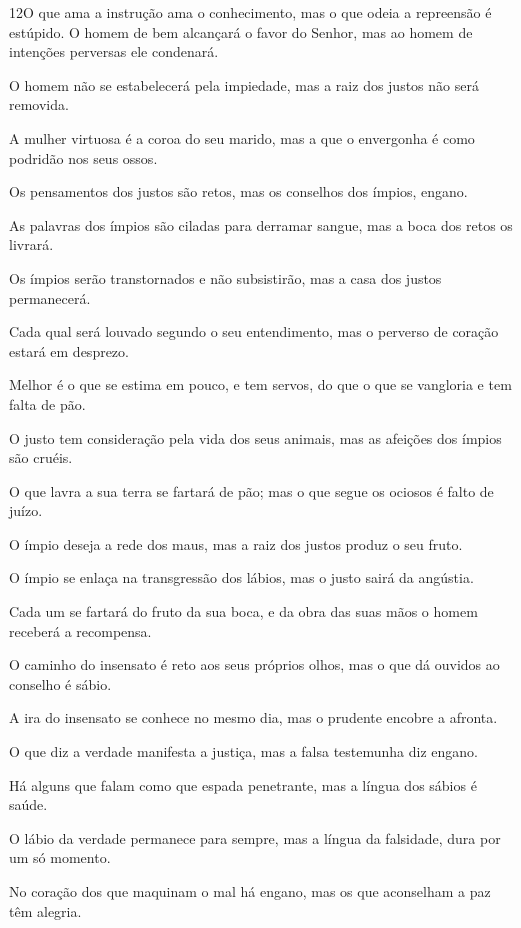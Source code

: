 \medskip

\lettrine{12}{}O que ama a instrução ama o conhecimento, mas o
que odeia a repreensão é estúpido.  O homem de bem
alcançará o favor do Senhor, mas ao homem de intenções perversas ele
condenará.

O homem não se estabelecerá pela impiedade, mas a raiz dos justos
não será removida.

A mulher virtuosa é a coroa do seu marido, mas a que o envergonha
é como podridão nos seus ossos.

Os pensamentos dos justos são retos, mas os conselhos dos ímpios,
engano.

As palavras dos ímpios são ciladas para derramar sangue, mas a
boca dos retos os livrará.

Os ímpios serão transtornados e não subsistirão, mas a casa dos
justos permanecerá.

Cada qual será louvado segundo o seu entendimento, mas o perverso
de coração estará em desprezo.

Melhor é o que se estima em pouco, e tem servos, do que o que se
vangloria e tem falta de pão.

O justo tem consideração pela vida dos seus animais, mas as
afeições dos ímpios são cruéis.

O que lavra a sua terra se fartará de pão; mas o que segue os
ociosos é falto de juízo.

O ímpio deseja a rede dos maus, mas a raiz dos justos produz o
seu fruto.

O ímpio se enlaça na transgressão dos lábios, mas o justo sairá
da angústia.

Cada um se fartará do fruto da sua boca, e da obra das suas mãos
o homem receberá a recompensa.

O caminho do insensato é reto aos seus próprios olhos, mas o que
dá ouvidos ao conselho é sábio.

A ira do insensato se conhece no mesmo dia, mas o prudente
encobre a afronta.

O que diz a verdade manifesta a justiça, mas a falsa testemunha
diz engano.

Há alguns que falam como que espada penetrante, mas a língua dos
sábios é saúde.

O lábio da verdade permanece para sempre, mas a língua da
falsidade, dura por um só momento.

No coração dos que maquinam o mal há engano, mas os que
aconselham a paz têm alegria.

